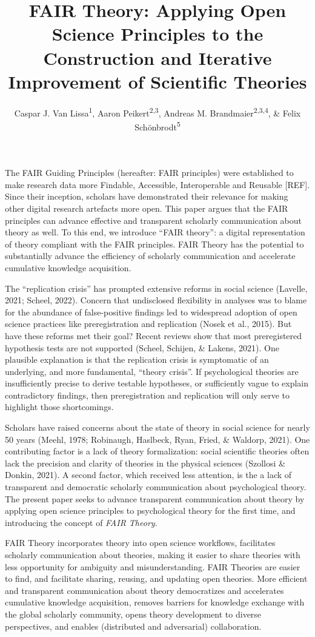 \documentclass[
  man]{apa6}
\title{FAIR Theory: Applying Open Science Principles to the Construction and Iterative Improvement of Scientific Theories}
\author{Caspar J. Van Lissa\textsuperscript{1}, Aaron Peikert\textsuperscript{2,3}, Andreas M. Brandmaier\textsuperscript{2,3,4}, \& Felix Schönbrodt\textsuperscript{5}}
\date{}
\affiliation{\vspace{0.5cm}\textsuperscript{1} Tilburg University, dept. Methodology \& Statistics\\\textsuperscript{2} Center for Lifespan Psychology, Max Planck Institute for Human Development, Berlin, Germany\\\textsuperscript{3} Max Planck UCL Centre for Computational Psychiatry and Ageing Research, Berlin, Germany\\\textsuperscript{4} Department of Psychology, MSB Medical School Berlin, Berlin, Germany\\\textsuperscript{5} Other affiliations}
\begin{document}
\maketitle

The FAIR Guiding Principles (hereafter: FAIR principles) were established to make research data more Findable, Accessible, Interoperable and Reusable {[}REF{]}.
Since their inception, scholars have demonstrated their relevance for making other digital research artefacts more open.
This paper argues that the FAIR principles can advance effective and transparent scholarly communication about theory as well.
To this end, we introduce ``FAIR theory'':
a digital representation of theory compliant with the FAIR principles.
FAIR Theory has the potential to substantially advance the efficiency of scholarly communication and accelerate cumulative knowledge acquisition.

The ``replication crisis'' has prompted extensive reforms in social science (Lavelle, 2021; Scheel, 2022).
Concern that undisclosed flexibility in analyses was to blame for the abundance of false-positive findings led to widespread adoption of open science practices like preregistration and replication (Nosek et al., 2015).
But have these reforms met their goal?
Recent reviews show that most preregistered hypothesis tests are not supported (Scheel, Schijen, \& Lakens, 2021).
One plausible explanation is that the replication crisis is symptomatic of an underlying,
and more fundamental, ``theory crisis''.
If psychological theories are insufficiently precise to derive testable hypotheses,
or sufficiently vague to explain contradictory findings,
then preregistration and replication will only serve to highlight those shortcomings.

Scholars have raised concerns about the state of theory in social science for nearly 50 years (Meehl, 1978; Robinaugh, Haslbeck, Ryan, Fried, \& Waldorp, 2021).
One contributing factor is a lack of theory formalization:
social scientific theories often lack the precision and clarity of theories in the physical sciences (Szollosi \& Donkin, 2021).
A second factor, which received less attention, is the a lack of transparent and democratic scholarly communication about psychological theory.
The present paper seeks to advance transparent communication about theory by applying open science principles to psychological theory for the first time,
and introducing the concept of \emph{FAIR Theory}.

FAIR Theory incorporates theory into open science workflows,
facilitates scholarly communication about theories,
making it easier to share theories with less opportunity for ambiguity and misunderstanding.
FAIR Theories are easier to find, and facilitate sharing, reusing, and updating open theories.
More efficient and transparent communication about theory democratizes and accelerates cumulative knowledge acquisition,
removes barriers for knowledge exchange with the global scholarly community,
opens theory development to diverse perspectives, and enables (distributed and adversarial) collaboration.
\end{document}
